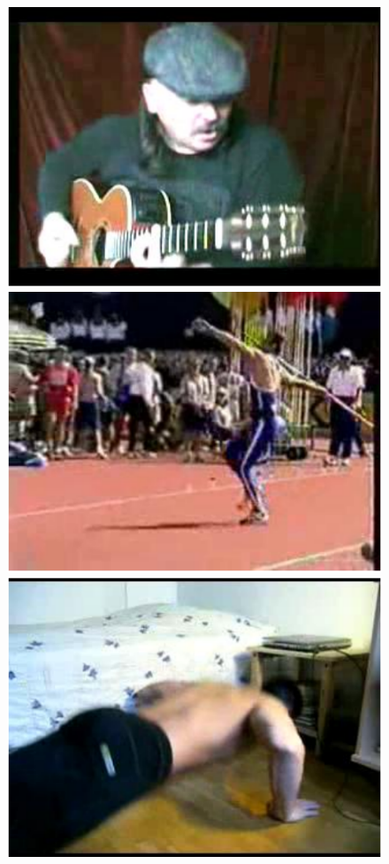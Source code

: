 \begin{figure}[!t]
\begin{center}
\includegraphics[scale=0.25]{cvpr14_figures/dataset_thumb/ucf/crop_class1.pdf}
\includegraphics[scale=0.25]{cvpr14_figures/dataset_thumb/ucf/crop_class2.pdf}
\includegraphics[scale=0.25]{cvpr14_figures/dataset_thumb/ucf/crop_class3.pdf} 

\end{center}
\end{figure}
